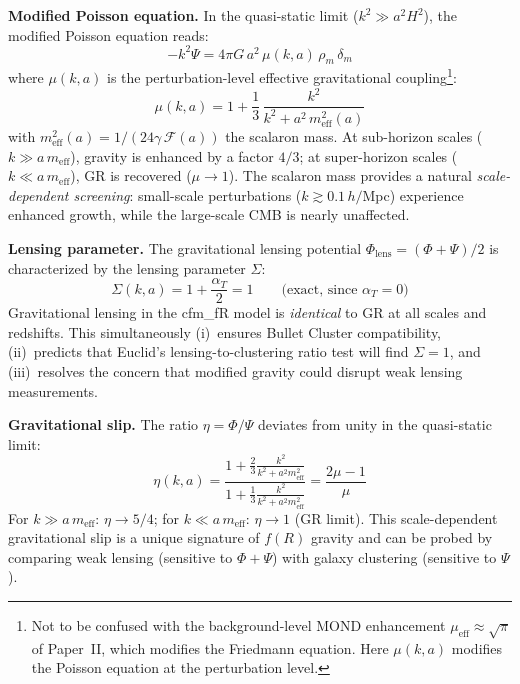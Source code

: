 \documentclass[aps,prd,twocolumn,superscriptaddress,nofootinbib]{revtex4-2}
\begin{document}
\textbf{Modified Poisson equation.} In the quasi-static limit ($k^2 \gg a^2 H^2$), the modified Poisson equation reads:
\begin{equation}
-k^2 \Psi = 4\pi G\,a^2\,\mu(k,a)\,\rho_m\,\delta_m
\label{eq:modified_poisson}
\end{equation}
where $\mu(k,a)$ is the perturbation-level effective gravitational coupling\footnote{Not to be confused with the background-level MOND enhancement $\mu_{\mathrm{eff}} \approx \sqrt{\pi}$ of Paper~II, which modifies the Friedmann equation. Here $\mu(k,a)$ modifies the Poisson equation at the perturbation level.}:
\begin{equation}
{\mu(k,a) = 1 + \frac{1}{3}\,\frac{k^2}{k^2 + a^2\,m_{\mathrm{eff}}^2(a)}}
\label{eq:mu_ka}
\end{equation}
with $m_{\mathrm{eff}}^2(a) = 1/(24\gamma\,\mathcal{F}(a))$ the scalaron mass. At sub-horizon scales ($k \gg a\,m_{\mathrm{eff}}$), gravity is enhanced by a factor $4/3$; at super-horizon scales ($k \ll a\,m_{\mathrm{eff}}$), GR is recovered ($\mu \to 1$). The scalaron mass provides a natural \textit{scale-dependent screening}: small-scale perturbations ($k \gtrsim 0.1\,h/$Mpc) experience enhanced growth, while the large-scale CMB is nearly unaffected.

\textbf{Lensing parameter.} The gravitational lensing potential $\Phi_{\mathrm{lens}} = (\Phi + \Psi)/2$ is characterized by the lensing parameter $\Sigma$:
\begin{equation}
{\Sigma(k,a) = 1 + \frac{\alpha_T}{2} = 1 \qquad \text{(exact, since $\alpha_T = 0$)}}
\label{eq:sigma_lensing}
\end{equation}
Gravitational lensing in the cfm\_fR model is \textit{identical} to GR at all scales and redshifts. This simultaneously (i)~ensures Bullet Cluster compatibility, (ii)~predicts that Euclid's lensing-to-clustering ratio test will find $\Sigma = 1$, and (iii)~resolves the concern that modified gravity could disrupt weak lensing measurements.

\textbf{Gravitational slip.} The ratio $\eta = \Phi/\Psi$ deviates from unity in the quasi-static limit:
\begin{equation}
\eta(k,a) = \frac{1 + \frac{2}{3}\frac{k^2}{k^2 + a^2 m_{\mathrm{eff}}^2}}{1 + \frac{1}{3}\frac{k^2}{k^2 + a^2 m_{\mathrm{eff}}^2}} = \frac{2\mu - 1}{\mu}
\end{equation}
For $k \gg a\,m_{\mathrm{eff}}$: $\eta \to 5/4$; for $k \ll a\,m_{\mathrm{eff}}$: $\eta \to 1$ (GR limit). This scale-dependent gravitational slip is a unique signature of $f(R)$ gravity and can be probed by comparing weak lensing (sensitive to $\Phi + \Psi$) with galaxy clustering (sensitive to $\Psi$).
\end{document}
